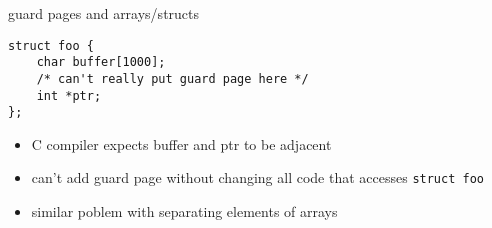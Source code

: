 \begin{frame}[fragile]{guard pages and arrays/structs}
\begin{Verbatim}
struct foo {
    char buffer[1000];
    /* can't really put guard page here */
    int *ptr;
};
\end{Verbatim}
\begin{itemize}
\item C compiler expects buffer and ptr to be adjacent
\item can't add guard page without changing all code that accesses \texttt{struct foo}
\item similar poblem with separating elements of arrays
\end{itemize}
\end{frame}
